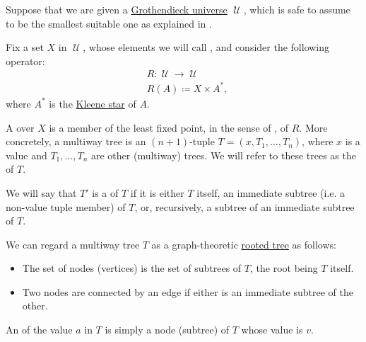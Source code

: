 \begin{definition}\label{def:multiway_tree}\mimprovised
  Suppose that we are given a \hyperref[def:grothendieck_universe]{Grothendieck universe} \( \mscrU \), which is safe to assume to be the smallest suitable one as explained in .

  Fix a set \( X \) in \( \mscrU \), whose elements we will call , and consider the following operator:
  \begin{equation*}
    \begin{aligned}
      &R: \mscrU \to \mscrU \\
      &R(A) \coloneqq X \times A^*,
    \end{aligned}
  \end{equation*}
  where \( A^* \) is the \hyperref[def:formal_language/kleene_star]{Kleene star} of \( A \).

  A  over \( X \) is a member of the least fixed point, in the sense of , of \( R \). More concretely, a multiway tree is an \( (n + 1) \)-tuple \( T = (x, T_1, \ldots, T_n) \), where \( x \) is a value and \( T_1, \ldots, T_n \) are other (multiway) trees. We will refer to these trees as the  of \( T \).

  \begin{thmenum}
     We will say that \( T' \) is a  of \( T \) if it is either \( T \) itself, an immediate subtree (i.e. a non-value tuple member) of \( T \), or, recursively, a subtree of an immediate subtree of \( T \).

     We can regard a multiway tree \( T \) as a graph-theoretic \hyperref[def:rooted_tree]{rooted tree} as follows:
    \begin{itemize}
      \item The set of nodes (vertices) is the set of subtrees of \( T \), the root being \( T \) itself.
      \item Two nodes are connected by an edge if either is an immediate subtree of the other.
    \end{itemize}

     An  of the value \( a \) in \( T \) is simply a node (subtree) of \( T \) whose value is \( v \).
  \end{thmenum}
\end{definition}
